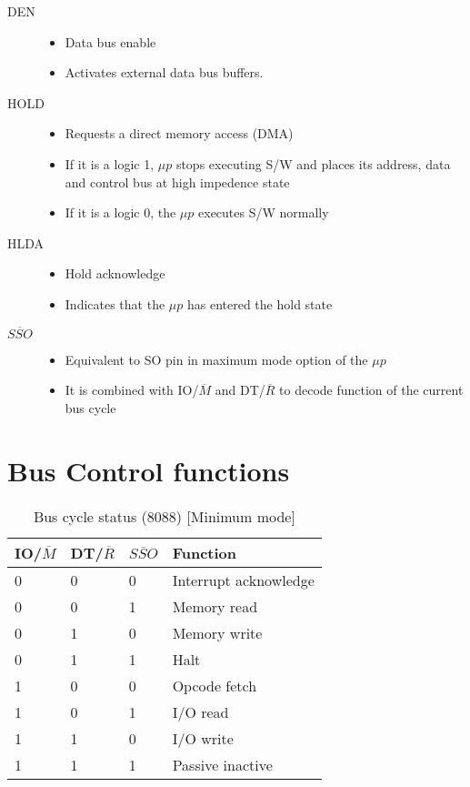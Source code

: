 \begin{description}
  \item[DEN]
  \begin{itemize}
      \item Data bus enable
      \item Activates external data bus buffers.
  \end{itemize}

  \item[HOLD]
  \begin{itemize}
      \item Requests a direct memory access (DMA)
      \item If it is a logic 1, $\mu p$ stops executing S/W and places its address, data and control
      bus at high impedence state
      \item If it is a logic 0, the $\mu p$ executes S/W normally
  \end{itemize}

  \item[HLDA]
  \begin{itemize}
      \item Hold acknowledge
      \item Indicates that the $\mu p$ has entered the hold state
  \end{itemize}

  \item[$\overline{SSO}$]
  \begin{itemize}
      \item Equivalent to SO pin in maximum mode option of the $\mu p$
      \item It is combined with IO/$\overline{M}$ and DT/$\overline{R}$ to decode function of the current bus cycle
  \end{itemize}

\end{description}
\newpage
\section{Bus Control functions}

\begin{table}[h!]
\centering
\begin{tabular}{ |p{1cm}|p{1cm}|p{1cm}|p{3cm}|  }
\hline
IO/$ \overline{M} $ & DT/$ \overline{R} $ & $ \overline{SSO} $& Function   \\
\hline
0 & 0 & 0 & Interrupt acknowledge \\
0 & 0 & 1 & Memory read \\
0 & 1 & 0 & Memory write \\
0 & 1 & 1 & Halt \\
1 & 0 & 0 & Opcode fetch \\
1 & 0 & 1 & I/O read \\
1 & 1 & 0 & I/O write \\
1 & 1 & 1 & Passive inactive \\
\hline
\end{tabular}

\caption{Bus cycle status (8088) [Minimum mode]}
\label{table:1}
\end{table}


